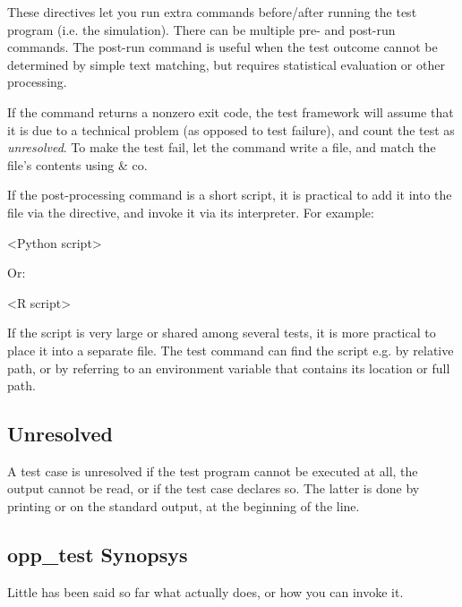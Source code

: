 These directives let you run extra commands before/after running the test
program (i.e. the simulation). There can be multiple pre- and post-run
commands. The post-run command is useful when the test outcome cannot be determined
by simple text matching, but requires statistical evaluation or other processing.

If the command returns a nonzero exit code, the test framework will assume that
it is due to a technical problem (as opposed to test failure), and count the
test as \textit{unresolved}. To make the test fail, let the command write a
file, and match the file's contents using  \& co.

If the post-processing command is a short script, it is practical
to add it into the  file via the  directive,
and invoke it via its interpreter. For example:

\begin{filelisting}
<Python script>
\end{filelisting}

Or:

\begin{filelisting}
<R script>
\end{filelisting}

If the script is very large or shared among several tests, it is more practical
to place it into a separate file. The test command can find the script e.g.
by relative path, or by referring to an environment variable that contains
its location or full path.


\subsection{Unresolved}
\label{sec:testing:opptest:unresolved}

A test case is unresolved if the test program cannot be executed at all, the
output cannot be read, or if the test case declares so. The latter is done
by printing  or  on the
standard output, at the beginning of the line.


\subsection{opp\_test Synopsys}
\label{sec:testing:opptest:synopsys}

Little has been said so far what  actually does, or how you
can invoke it.


